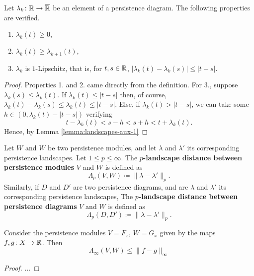 \begin{lemma} \label{lemma:landscapes-aux-3}
    Let $ \lambda_k \colon \mathbb R \to \overline{\mathbb R} $ be an element of a persistence diagram. The following properties are verified.
    \begin{enumerate}
        \item $\lambda_k(t) \geq 0$,
        \item $\lambda_k(t) \geq \lambda_{k+1}(t)$,
        \item $\lambda_k$ is $1$-Lipschitz, that is, for $ t, s \in \mathbb R $, $ | \lambda_k(t) - \lambda_k(s) | \leq |t-s| $.
    \end{enumerate}
\end{lemma}
\begin{proof}
    Properties 1. and 2. came directly from the definition. For 3., suppose $ \lambda_k(s) \leq \lambda_k(t) $. If $ \lambda_k(t) \leq |t -s | $ then, of course, $ \lambda_k(t) - \lambda_k(s) \leq \lambda_k(t) \leq |t-s| $. Else, if $ \lambda_k(t) >  |t - s | $, we can take some $ h \in (0, \lambda_k(t) -  |t - s |) $ verifying
    \begin{equation}
        t - \lambda_k(t) < s- h < s + h < t + \lambda_k(t).
    \end{equation}
    Hence, by Lemma \ref{lemma:landscapes-aux-1}
\end{proof}

\begin{definition}
    Let $ W $ and $ W $ be two persistence modules, and let $ \lambda $ and $ \lambda' $ its corresponding persistence landscapes. Let $ 1 \leq p \leq \infty $. The {\bf $p$-landscape distance between persistence modules} $ V $ and $ W $ is defined as
    \begin{equation}
        \Lambda_p(V, W) \coloneq \|\lambda - \lambda' \|_p.
    \end{equation}
    Similarly, if $ D $ and $ D' $ are two persistence diagrams, and are $ \lambda $ and $ \lambda' $ its corresponding persistence landscapes, The {\bf $p$-landscape distance between persistence diagrams} $ V $ and $ W $ is defined as
    \begin{equation}
        \Lambda_p(D, D') \coloneq \|\lambda - \lambda' \|_p.
    \end{equation}
\end{definition}

\begin{theorem}
    Consider the persistence modules $ V = F_x $, $ W = G_x $ given by the maps $ f, g \colon X \to \mathbb R $. Then
    \begin{equation}
        \Lambda_\infty(V, W) \leq \| f - g\|_\infty
    \end{equation}
\end{theorem}
\begin{proof}
    ...
\end{proof}

